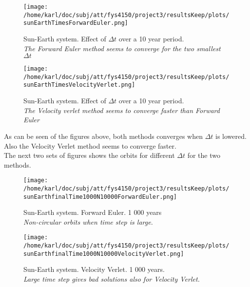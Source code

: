 \documentclass{article}
\begin{document}
\begin{minipage}{.45\textwidth} 
	\begin{figure}[H]
		\centering
		\texttt{[image: /home/karl/doc/subj/att/fys4150/project3/resultsKeep/plots/sunEarthTimesForwardEuler.png]}
		\caption{Sun-Earth system. Effect of $\Delta t$ over a 10 year period. \\ \textit{The Forward Euler method seems to converge for the two smallest $\Delta t$}}
		\label{1}
	\end{figure}
\end{minipage}\hfill
\begin{minipage}{.45\textwidth} 
	\begin{figure}[H]
		\centering
		\texttt{[image: /home/karl/doc/subj/att/fys4150/project3/resultsKeep/plots/sunEarthTimesVelocityVerlet.png]}
		\caption{Sun-Earth system. Effect of $\Delta t$ over a 10 year period. \\ \textit{The Velocity verlet method seems to converge faster than Forward Euler}}
		\label{1}
	\end{figure}
\end{minipage}\hfill
\vspace{2ex}

As can be seen of the figures above, both methods converges when $\Delta t$ is lowered.  Also the Velocity Verlet method seems to converge faster.\\

The next two sets of figures shows the orbits for different $\Delta t$ for the two methods.

\begin{minipage}{.45\textwidth} 
	\begin{figure}[H]
		\centering
		\texttt{[image: /home/karl/doc/subj/att/fys4150/project3/resultsKeep/plots/sunEarthfinalTime1000N10000ForwardEuler.png]}
		\caption{Sun-Earth system. Forward Euler. 1 000 years \\ \textit{Non-circular orbits when time step is large.}}
		\label{1}
	\end{figure}
\end{minipage}\hfill
\begin{minipage}{.45\textwidth} 
	\begin{figure}[H]
		\centering
		\texttt{[image: /home/karl/doc/subj/att/fys4150/project3/resultsKeep/plots/sunEarthfinalTime1000N10000VelocityVerlet.png]}
		\caption{Sun-Earth system. Velocity Verlet. 1 000 years. \\ \textit{Large time step gives bad solutions also for Velocity Verlet.}}
		\label{1}
	\end{figure}
\end{minipage}\hfill
\vspace{2ex}
\end{document}
